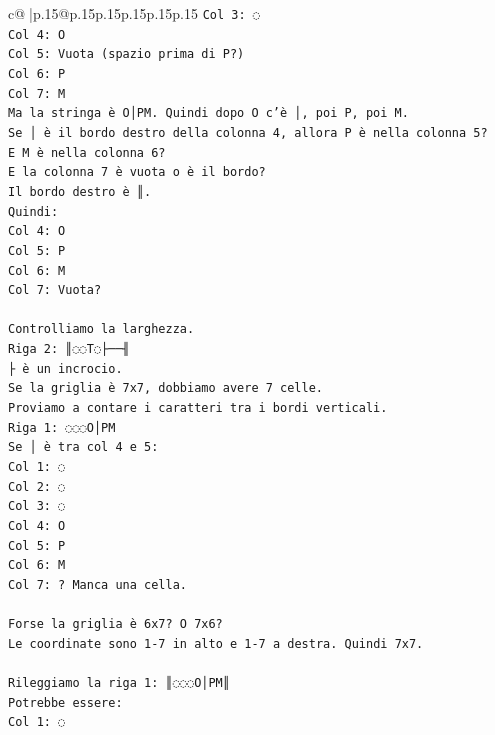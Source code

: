 \documentclass{article}
\begin{document}
{\begin{supertabular}{c@{$\;$}|p{.15\linewidth}@{}p{.15\linewidth}p{.15\linewidth}p{.15\linewidth}p{.15\linewidth}p{.15\linewidth}}
{{{\texttt{Col 3: ◌} \\
\texttt{Col 4: O} \\
\texttt{Col 5: Vuota (spazio prima di P?)} \\
\texttt{Col 6: P} \\
\texttt{Col 7: M} \\
\texttt{Ma la stringa è O│PM. Quindi dopo O c'è │, poi P, poi M.} \\
\texttt{Se │ è il bordo destro della colonna 4, allora P è nella colonna 5?} \\
\texttt{E M è nella colonna 6?} \\
\texttt{E la colonna 7 è vuota o è il bordo?} \\
\texttt{Il bordo destro è ║.} \\
\texttt{Quindi:} \\
\texttt{Col 4: O} \\
\texttt{Col 5: P} \\
\texttt{Col 6: M} \\
\texttt{Col 7: Vuota?} \\
\\ 
\texttt{Controlliamo la larghezza.} \\
\texttt{Riga 2: ║◌◌T◌├──╢} \\
\texttt{├ è un incrocio.} \\
\texttt{Se la griglia è 7x7, dobbiamo avere 7 celle.} \\
\texttt{Proviamo a contare i caratteri tra i bordi verticali.} \\
\texttt{Riga 1: ◌◌◌O│PM} \\
\texttt{Se │ è tra col 4 e 5:} \\
\texttt{Col 1: ◌} \\
\texttt{Col 2: ◌} \\
\texttt{Col 3: ◌} \\
\texttt{Col 4: O} \\
\texttt{Col 5: P} \\
\texttt{Col 6: M} \\
\texttt{Col 7: ? Manca una cella.} \\
\\ 
\texttt{Forse la griglia è 6x7? O 7x6?} \\
\texttt{Le coordinate sono 1{-}7 in alto e 1{-}7 a destra. Quindi 7x7.} \\
\\ 
\texttt{Rileggiamo la riga 1: ║◌◌◌O│PM║} \\
\texttt{Potrebbe essere:} \\
\texttt{Col 1: ◌} \\
}}}
\end{supertabular}}
\end{document}
